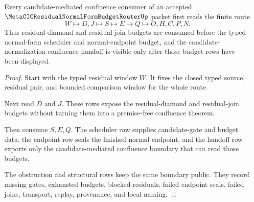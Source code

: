 \begin{theorem}
\label{thm:metacic-residual-normal-form-budget-router-handoff}
Every candidate-mediated confluence consumer of an accepted $\MetaCICResidualNormalFormBudgetRouterUp$ packet first reads the finite route
$$
W \longmapsto D,J \longmapsto S \longmapsto E \longmapsto Q \longmapsto O,H,C,P,N .
$$
Thus residual diamond and residual join budgets are consumed before the typed normal-form scheduler and normal-endpoint budget, and the candidate-normalization confluence handoff is visible only after those budget rows have been displayed.
\end{theorem}
\begin{proof}
Start with the typed residual window $W$. It fixes the closed typed source, residual pair, and bounded comparison window for the whole route.

Next read $D$ and $J$. These rows expose the residual-diamond and residual-join budgets without turning them into a premise-free confluence theorem.

Then consume $S,E,Q$. The scheduler row supplies candidate-gate and budget data, the endpoint row seals the finished normal endpoint, and the handoff row exports only the candidate-mediated confluence boundary that can read those budgets.

The obstruction and structural rows keep the same boundary public. They record missing gates, exhausted budgets, blocked residuals, failed endpoint seals, failed joins, transport, replay, provenance, and local naming.
\end{proof}



